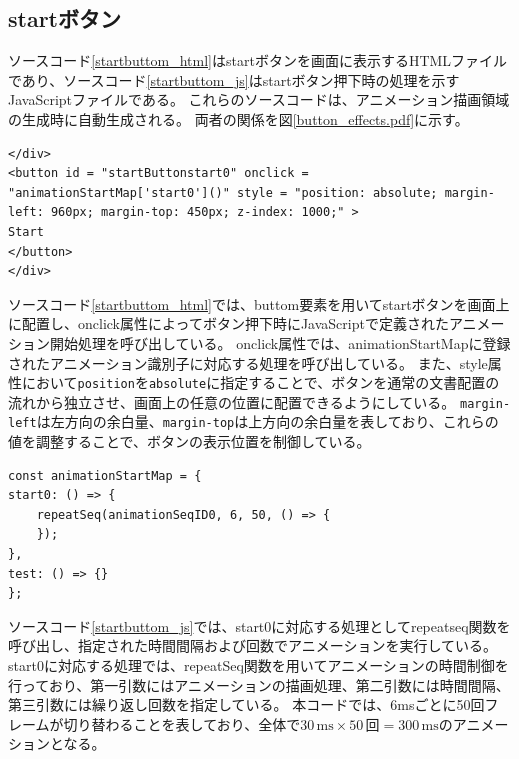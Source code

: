 \subsection{startボタン}\label{subsec:startbuttom}
ソースコード\ref{startbuttom_html}はstartボタンを画面に表示するHTMLファイルであり、ソースコード\ref{startbuttom_js}はstartボタン押下時の処理を示すJavaScriptファイルである。
これらのソースコードは、アニメーション描画領域の生成時に自動生成される。
両者の関係を図\ref{button_effects.pdf}に示す。
 \begin{lstlisting}[caption={startボタン（HTMLファイル）},label={startbuttom_html},breaklines=true,breakatwhitespace=false]
</div>
<button id = "startButtonstart0" onclick = "animationStartMap['start0']()" style = "position: absolute; margin-left: 960px; margin-top: 450px; z-index: 1000;" >
Start
</button>
</div>
\end{lstlisting}
ソースコード\ref{startbuttom_html}では、buttom要素を用いてstartボタンを画面上に配置し、onclick属性によってボタン押下時にJavaScriptで定義されたアニメーション開始処理を呼び出している。
onclick属性では、animationStartMapに登録されたアニメーション識別子に対応する処理を呼び出している。
また、style属性において\texttt{position}を\texttt{absolute}に指定することで、ボタンを通常の文書配置の流れから独立させ、画面上の任意の位置に配置できるようにしている。
\texttt{margin-left}は左方向の余白量、\texttt{margin-top}は上方向の余白量を表しており、これらの値を調整することで、ボタンの表示位置を制御している。
 \begin{lstlisting}[caption={startボタン（JavaScriptファイル）},label={startbuttom_js},breaklines=true,breakatwhitespace=false]
const animationStartMap = {
start0: () => {
    repeatSeq(animationSeqID0, 6, 50, () => {
    });
},
test: () => {}
};
\end{lstlisting}
ソースコード\ref{startbuttom_js}では、start0に対応する処理としてrepeatseq関数を呼び出し、指定された時間間隔および回数でアニメーションを実行している。
start0に対応する処理では、repeatSeq関数を用いてアニメーションの時間制御を行っており、第一引数にはアニメーションの描画処理、第二引数には時間間隔、第三引数には繰り返し回数を指定している。
本コードでは、6msごとに50回フレームが切り替わることを表しており、全体で$30\,\mathrm{ms} \times 50\,\text{回} = 300\,\mathrm{ms}$のアニメーションとなる。

